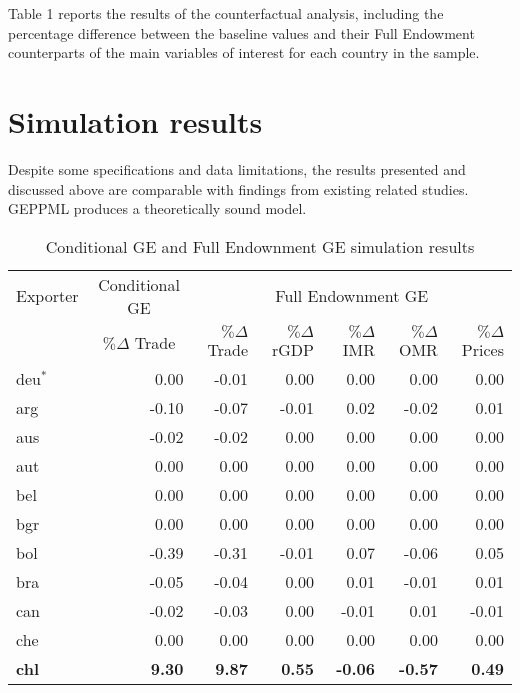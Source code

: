 \documentclass[10pt]{article}
\begin{document}
Table 1 reports the results of the counterfactual analysis, including
the percentage difference between the baseline values and their Full
Endowment counterparts of the main variables of interest for each
country in the sample.

\hypertarget{simulation-results}{%
\section{Simulation results}\label{simulation-results}}

Despite some specifications and data limitations, the results presented
and discussed above are comparable with findings from existing related
studies. GEPPML produces a theoretically sound model.

\begin{longtable}[t]{lrrrrrr}
\caption{Conditional GE and Full Endownment GE simulation results}\\
\toprule
Exporter & \multicolumn{1}{c}{Conditional GE} & \multicolumn{5}{c}{Full Endownment GE}\\
 & \multicolumn{1}{c}{$\%\Delta$ Trade} & $\%\Delta$ Trade & $\%\Delta$ rGDP & $\%\Delta$ IMR & $\%\Delta$ OMR & $\%\Delta$ Prices\\
\midrule
deu$^*$ & 0.00 & -0.01 & 0.00 & 0.00 & 0.00 & 0.00\\
arg & -0.10 & -0.07 & -0.01 & 0.02 & -0.02 & 0.01\\
aus & -0.02 & -0.02 & 0.00 & 0.00 & 0.00 & 0.00\\
aut & 0.00 & 0.00 & 0.00 & 0.00 & 0.00 & 0.00\\
bel & 0.00 & 0.00 & 0.00 & 0.00 & 0.00 & 0.00\\
\addlinespace
bgr & 0.00 & 0.00 & 0.00 & 0.00 & 0.00 & 0.00\\
bol & -0.39 & -0.31 & -0.01 & 0.07 & -0.06 & 0.05\\
bra & -0.05 & -0.04 & 0.00 & 0.01 & -0.01 & 0.01\\
can & -0.02 & -0.03 & 0.00 & -0.01 & 0.01 & -0.01\\
che & 0.00 & 0.00 & 0.00 & 0.00 & 0.00 & 0.00\\
\addlinespace
\textbf{chl} & \textbf{9.30} & \textbf{9.87} & \textbf{0.55} & \textbf{-0.06} & \textbf{-0.57} & \textbf{0.49}\\

\end{longtable}
\end{document}
